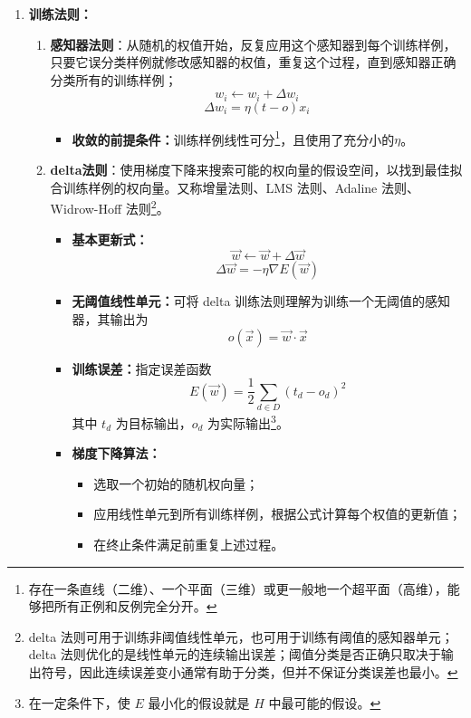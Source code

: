 \documentclass[../main.tex]{subfiles}
\begin{document}
\begin{enumerate}
\begin{itemize}
        \item 要把一个AND感知器的输入求反只要简单地改变相应输入权的符号。
    \end{itemize}
    \item \textbf{训练法则：}
    \begin{enumerate}
        \item \textbf{感知器法则}：从随机的权值开始，反复应用这个感知器到每个训练样例，只要它误分类样例就修改感知器的权值，重复这个过程，直到感知器正确分类所有的训练样例；
        \[
        w_i \leftarrow w_i + \Delta w_i
        \]
        \[
        \Delta w_i = \eta (t - o)x_i
        \]
        \begin{itemize}
            \item \textbf{收敛的前提条件：}训练样例线性可分\footnote{存在一条直线（二维）、一个平面（三维）或更一般地一个超平面（高维），能够把所有正例和反例完全分开。}，且使用了充分小的$\eta$。
        \end{itemize}
        \item \textbf{delta法则}：使用梯度下降来搜索可能的权向量的假设空间，以找到最佳拟合训练样例的权向量。又称增量法则、LMS 法则、Adaline 法则、Widrow-Hoff 法则\footnote{delta 法则可用于训练非阈值线性单元，也可用于训练有阈值的感知器单元；delta 法则优化的是线性单元的连续输出误差；阈值分类是否正确只取决于输出符号，因此连续误差变小通常有助于分类，但并不保证分类误差也最小。}。
        \begin{itemize}
            \item \textbf{基本更新式：}
            \[
                \vec{w}\leftarrow \vec{w}+\Delta\vec{w}
            \]
            \[
                \Delta\vec{w}=-\eta \nabla E(\vec{w})
            \]
            \item \textbf{无阈值线性单元：}可将 delta 训练法则理解为训练一个无阈值的感知器，其输出为
            \[
                o(\vec{x})=\vec{w}\cdot\vec{x}
            \]
            \item \textbf{训练误差：}指定误差函数
            \[
                E(\vec{w})=\frac{1}{2}\sum_{d\in D}(t_d-o_d)^2
            \]
            其中 $t_d$ 为目标输出，$o_d$ 为实际输出\footnote{在一定条件下，使 $E$ 最小化的假设就是 $H$ 中最可能的假设。}。

            \item \textbf{梯度下降算法：}
            \begin{itemize}
                \item 选取一个初始的随机权向量；
                \item 应用线性单元到所有训练样例，根据公式计算每个权值的更新值；
                \item 在终止条件满足前重复上述过程。
            \end{itemize}


\end{itemize}
\end{enumerate}
\end{enumerate}
\end{document}
